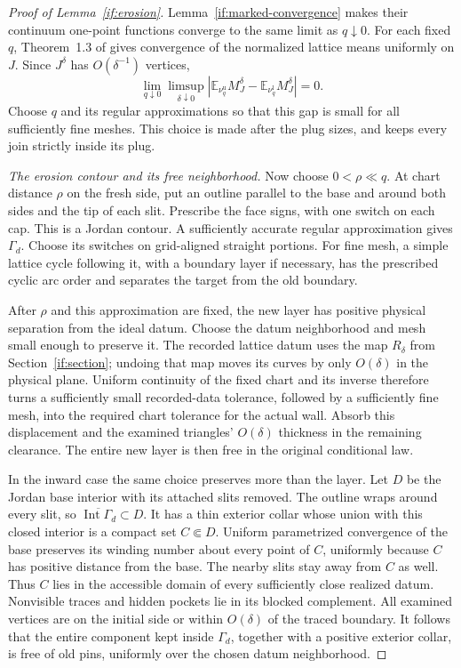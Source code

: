 \begin{proof}[Proof of Lemma~\ref{if:erosion}]
Lemma~\ref{if:marked-convergence} makes their continuum one-point
functions converge to the same limit as $q\downarrow0$. For each
fixed $q$, Theorem~1.3 of \cite{CHI2021} gives convergence of the
normalized lattice means uniformly on $J$. Since $J^\delta$ has
$O(\delta^{-1})$ vertices,
\begin{equation}\label{if:envelope-line-gap}
 \lim_{q\downarrow0}\limsup_{\delta\downarrow0}
   |\mathbb E_{\nu_q^{\mathrm u}}M_J^\delta
       -\mathbb E_{\nu_q^{\mathrm l}}M_J^\delta|=0.
\end{equation}
Choose $q$ and its regular approximations so that this gap is small
for all sufficiently fine meshes. This choice is made after the plug
sizes, and keeps every join strictly inside its plug.

\emph{The erosion contour and its free neighborhood.}
Now choose $0<\rho\ll q$. At chart distance $\rho$ on the fresh
side, put an outline parallel to the base and around both sides and
the tip of each slit. Prescribe the face signs, with one switch on
each cap. This is a Jordan contour. A sufficiently accurate regular
approximation gives $\Gamma_d$. Choose its switches on grid-aligned
straight portions. For fine mesh, a simple lattice cycle following
it, with a boundary layer if necessary, has the prescribed cyclic
arc order and separates the target from the old boundary.

After $\rho$ and this approximation are fixed, the new layer has
positive physical separation from the ideal datum. Choose the datum
neighborhood and mesh small enough to preserve it. The recorded
lattice datum uses the map $R_\delta$ from Section~\ref{if:section};
undoing that map moves its curves by only $O(\delta)$ in the physical
plane. Uniform continuity of the fixed chart and its inverse therefore
turns a sufficiently small recorded-data tolerance, followed by a
sufficiently fine mesh, into the required chart tolerance for the
actual wall. Absorb this displacement and the examined triangles'
$O(\delta)$ thickness in the remaining clearance. The entire new
layer is then free in the original conditional law.

In the inward case the same choice preserves more than the layer.
Let $D$ be the Jordan base interior with its attached slits removed.
The outline wraps around every slit, so
$\overline{\operatorname{Int}\Gamma_d}\subset D$. It has a thin
exterior collar whose union with this closed interior is a compact
set $C\Subset D$. Uniform parametrized convergence of the base
preserves its winding number about every point of $C$, uniformly
because $C$ has positive distance from the base. The nearby slits
stay away from $C$ as well. Thus $C$ lies in the accessible domain
of every sufficiently close realized datum. Nonvisible traces and
hidden pockets lie in its blocked complement. All examined vertices
are on the initial side or within $O(\delta)$ of the traced boundary.
It follows that the entire component kept inside $\Gamma_d$, together
with a positive exterior collar, is free of old pins, uniformly over
the chosen datum neighborhood.


\end{proof}
